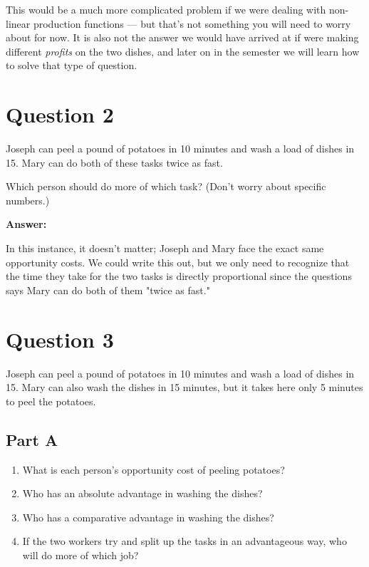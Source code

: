 \documentclass[12pt]{article}
\begin{document}


This would be a much more complicated problem if we were dealing with non-linear production functions --- but that's not something you will need to worry about for now. It is also not the answer we would have arrived at if were making different \textit{profits} on the two dishes, and later on in the semester we will learn how to solve that type of question.

\section*{Question 2}
Joseph can peel a pound of potatoes in 10 minutes and wash a load of dishes in 15. Mary can do both of these tasks twice as fast. 

\medskip

Which person should do more of which task? (Don't worry about specific numbers.)

\medskip

\textbf{Answer:}

In this instance, it doesn't matter; Joseph and Mary face the exact same opportunity costs. We could write this out, but we only need to recognize that the time they take for the two tasks is directly proportional since the questions says Mary can do both of them "twice as fast."

\section*{Question 3}
Joseph can peel a pound of potatoes in 10 minutes and wash a load of dishes in 15. Mary can also wash the dishes in 15 minutes, but it takes here only 5 minutes to peel the potatoes. 
    
\subsection*{Part A}
    \begin{enumerate}
        \item What is each person's opportunity cost of peeling potatoes?
        \item Who has an absolute advantage in washing the dishes?
        \item Who has a comparative advantage in washing the dishes?
        \item If the two workers try and split up the tasks in an advantageous way, who will do more of which job?
    \end{enumerate}
\end{document}

